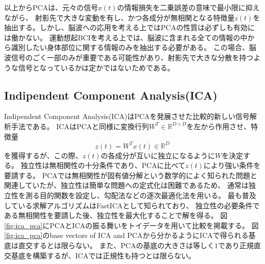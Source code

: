 以上からPCAは、元々の信号\(x(t)\)の情報損失を二乗誤差の意味で最小限に抑えながら、
射影先で大きな変動を有し、かつ各成分が無相関となる特徴量\(z(t)\)を抽出する。しかし、脳波への応用を考える上ではPCAの性質は必ずしも有効には働かない。
運動想起BCIを考える上では、脳波に含まれる全ての情報の中から識別したい身体部位に関する情報のみを抽出する必要がある。
この場合、脳波信号のごく一部のみが重要である可能性があり、射影先で大きな分散を持つような信号となっているかは定かではないためである。




\subsection{Indipendent Component Analysis(ICA)}
Indipendent Component Analysis(ICA)はPCAを発展させた比較的新しい信号解析手法である。
ICAはPCAと同様に変換行列\(W^T \in \mathbb R^{D \times D}\)を左から作用させ、特徴量
\begin{equation}
    z(t)=W^Tx(t) \in \mathbb R^D
\end{equation}
を獲得するが、この際、\(z(t)\)の各成分が互いに独立になるように\(W\)を決定する。
独立性は無相関性の十分条件であり、PCAに比べて\(z(t)\)により強い条件を要請する。
PCAでは無相関性が固有値分解という数学的によく知られた問題と関連していたが、独立性は簡単な問題への定式化は困難であるため、
通常は独立性を測る目的関数を設定し、勾配法などの逐次最適化法を用いる。
最も普及している求解アルゴリズムはFastICAとして知られており、
独立性の必要条件である無相関性を要請した後、独立性を最大化することで解を得る。
図\ref{fig:ica_pca}にPCAとICAの振る舞いをトイデータを用いて比較を掲載する。
図\ref{fig:ica_pca}のbase vectors of ICA and PCAから分かるようにICAで得られる基底は直交するとは限らない。
また、PCAの基底の大きさは等しく\(1\)であり正規直交基底を構築するが、ICAでは正規性も持つとは限らない。
